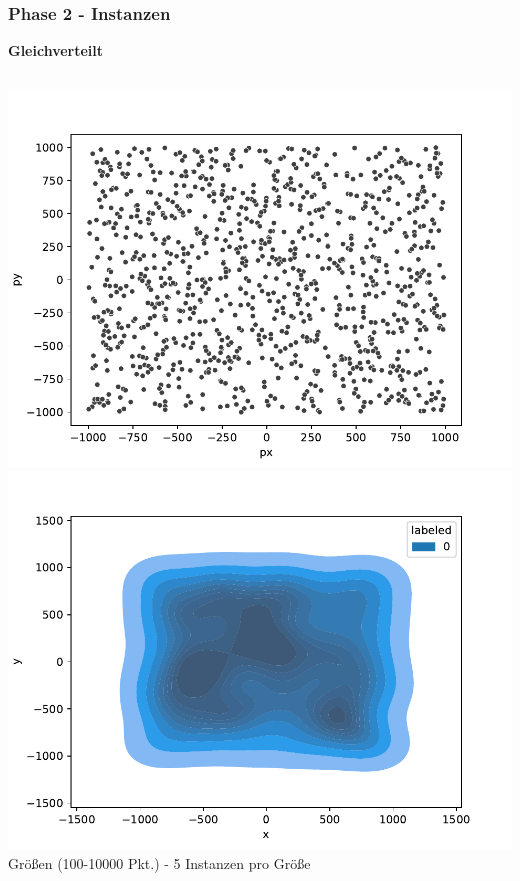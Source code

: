 \documentclass[aspectratio=169]{beamer}
\begin{document}


\begin{frame}
	\frametitle{Phase 2 - Instanzen}
	\textbf{Gleichverteilt}
	\begin{columns}[c] %
		
		\includegraphics[scale=.41]{scatter_1000_ran0.pdf}
		\includegraphics[scale=.41]{density_1000_ran0.pdf}\\
		 Größen (100-10000 Pkt.) - 5 Instanzen pro Größe 
		
	
	\end{columns}
	\end{frame}
	
\end{document}
